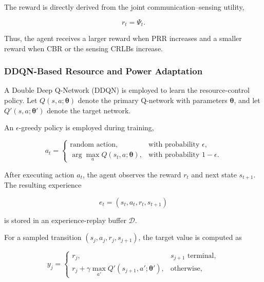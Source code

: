The reward is directly derived from the joint communication--sensing
utility,

\begin{equation}
r_t
=
\Psi_t.
\label{eq:isac_mdp_reward}
\end{equation}

Thus, the agent receives a larger reward when PRR increases and a smaller
reward when CBR or the sensing CRLBs increase.

\subsubsection{DDQN-Based Resource and Power Adaptation}

A Double Deep Q-Network (DDQN) is employed to learn the resource-control
policy. Let $Q(s,a;\boldsymbol{\theta})$ denote the primary Q-network with
parameters $\boldsymbol{\theta}$, and let
$Q'(s,a;\boldsymbol{\theta}')$ denote the target network.

An $\epsilon$-greedy policy is employed during training,

\begin{equation}
a_t
=
\begin{cases}
\text{random action},
&
\text{with probability } \epsilon,
\\[1mm]
\displaystyle
\arg\max_{a}
Q
\left(
s_t,a;\boldsymbol{\theta}
\right),
&
\text{with probability }1-\epsilon.
\end{cases}
\label{eq:isac_epsilon_greedy}
\end{equation}

After executing action $a_t$, the agent observes the reward $r_t$ and
next state $s_{t+1}$. The resulting experience

\begin{equation}
e_t
=
\left(
s_t,a_t,r_t,s_{t+1}
\right)
\label{eq:isac_experience_tuple}
\end{equation}

is stored in an experience-replay buffer $\mathcal{D}$.

For a sampled transition
$(s_j,a_j,r_j,s_{j+1})$, the target value is computed as

\begin{equation}
y_j
=
\begin{cases}
r_j,
&
s_{j+1}
\text{ terminal},
\\[1mm]
r_j
+
\gamma
\displaystyle
\max_{a'}
Q'
\left(
s_{j+1},a';\boldsymbol{\theta}'
\right),
&
\text{otherwise},
\end{cases}
\label{eq:isac_ddqn_target}
\end{equation}

